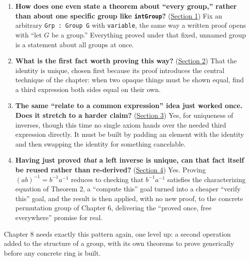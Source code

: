 \begin{enumerate}
\def\labelenumi{\arabic{enumi}.}
\tightlist
\item
  \textbf{How does one even state a theorem about ``every group,'' rather than about one specific group like \texttt{intGroup}?} (\hyperref[sec:07-group-theorems:01-setup:1]{Section 1}) Fix an arbitrary \texttt{Grp : Group G} with \texttt{variable}, the same way a written proof opens with ``let \(G\) be a group.'' Everything proved under that fixed, unnamed group is a statement about all groups at once.
\item
  \textbf{What is the first fact worth proving this way?} (\hyperref[sec:07-group-theorems:02-theorem-1:1]{Section 2}) That the identity is unique, chosen first because its proof introduces the central technique of the chapter: when two opaque things must be shown equal, find a third expression both sides equal on their own.
\item
  \textbf{The same ``relate to a common expression'' idea just worked once. Does it stretch to a harder claim?} (\hyperref[sec:07-group-theorems:03-theorem-2:1]{Section 3}) Yes, for uniqueness of inverses, though this time no single axiom hands over the needed third expression directly. It must be built by padding an element with the identity and then swapping the identity for something cancelable.
\item
  \textbf{Having just proved \emph{that} a left inverse is unique, can that fact itself be reused rather than re-derived?} (\hyperref[sec:07-group-theorems:04-theorem-3:1]{Section 4}) Yes. Proving \((ab)^{-1} = b^{-1}a^{-1}\) reduces to checking that \(b^{-1}a^{-1}\) satisfies the characterizing equation of Theorem 2, a ``compute this'' goal turned into a cheaper ``verify this'' goal, and the result is then applied, with no new proof, to the concrete permutation group of Chapter 6, delivering the ``proved once, free everywhere'' promise for real.
\end{enumerate}

Chapter 8 needs exactly this pattern again, one level up: a second operation added to the structure of a group, with its own theorems to prove generically before any concrete ring is built.







